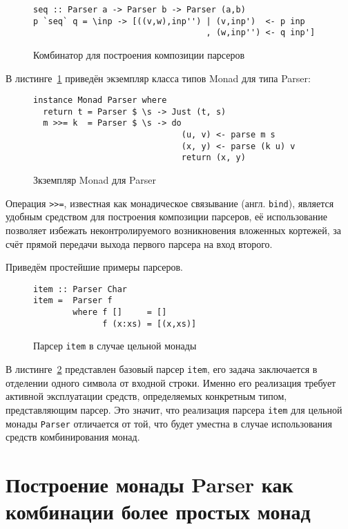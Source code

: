 \begin{figure}[h]
\begin{lstlisting}
seq :: Parser a -> Parser b -> Parser (a,b)
p `seq` q = \inp -> [((v,w),inp'') | (v,inp')  <- p inp
                                   , (w,inp'') <- q inp']
\end{lstlisting}
\caption{Комбинатор для построения композиции парсеров}
\end{figure}

В листинге~\ref{listing:MonadParser} приведён экземпляр класса типов Monad для 
типа Parser:

\begin{figure}[t]
  \begin{lstlisting}
instance Monad Parser where
  return t = Parser $ \s -> Just (t, s)
  m >>= k  = Parser $ \s -> do
                              (u, v) <- parse m s
                              (x, y) <- parse (k u) v
                              return (x, y)
  \end{lstlisting}
  \caption{Зкземпляр Monad для Parser}
  \label{listing:MonadParser}
\end{figure}

Операция \lstinline{>>=}, известная как монадическое связывание 
(англ. \lstinline{bind}), является удобным средством для построения композиции 
парсеров, её использование позволяет избежать неконтролируемого возникновения
вложенных кортежей, за счёт прямой передачи выхода первого парсера на вход
второго.

Приведём простейшие примеры парсеров.

\begin{figure}[h]
  \begin{lstlisting}
item :: Parser Char
item =  Parser f
        where f []     = []
              f (x:xs) = [(x,xs)]
  \end{lstlisting}
  \caption{Парсер \lstinline{item} в случае цельной монады}
  \label{listing:ParserItem}
\end{figure}

В листинге~\ref{listing:ParserItem} представлен базовый парсер \lstinline{item},
его задача заключается в отделении одного символа от входной строки. Именно его
реализация требует активной эксплуатации средств, определяемых конкретным типом,
представляющим парсер. Это значит, что реализация парсера \lstinline{item} для
цельной монады \lstinline{Parser} отличается от той, что будет уместна в случае
использования средств комбинирования монад.

\section{Построение монады Parser как комбинации более простых монад}

